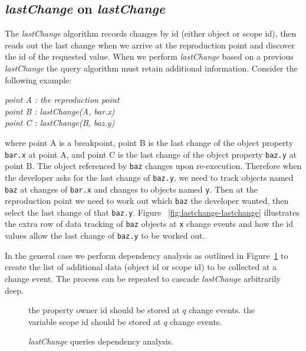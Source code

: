 \documentclass[runningheads,a4paper]{llncs}
\begin{document}
\subsection{\textit{lastChange} on \textit{lastChange}}
The \textit{lastChange} algorithm records changes by id (either object or scope id), then reads out the last change when we
arrive at the reproduction point and discover the id of the requested value.
When we perform \textit{lastChange} based on a previous \textit{lastChange} the query algorithm 
must retain additional information. Consider the following example:
\begin{center}
\textit{
 point A : the reproduction point \\
 point B : lastChange(A, bar.x) \\
 point C : lastChange(B, baz.y) 
 }
 \end{center}
where point A is a breakpoint, point B is the last change of the object property \texttt{bar.x} at point A, and
point C is the last change of the object property \texttt{baz.y} at point B. 
The object referenced by \texttt{baz} changes upon re-execution. Therefore when the developer
asks for the last change of \texttt{baz.y}, we need to track objects named \texttt{baz}
at changes of \texttt{bar.x} and changes to objects named \texttt{y}. Then at the reproduction point
we need to work out which \texttt{baz} the developer wanted, then select the last change of that \texttt{baz.y}.
Figure ~\ref{fig:lastchange-lastchange} illustrates the extra row of data tracking of \texttt{baz} objects 
at \texttt{x} change events 
and how the id values allow the last change of \texttt{baz.y} to be worked out. 
 
In the general case we perform dependency analysis  as outlined in 
Figure~\ref{fig:dependency-analysis} to
create the list of additional data (object id or scope id) to be collected at a change
event. The process can be repeated to cascade \textit{lastChange} arbitrarily deep.

\begin{figure}[htp]
\centering 
\begin{algorithmic}

     \STATE the property owner id should be stored at $q$ change events. 
     \STATE the variable scope id should be stored at $q$ change events.
	 \ENDIF 
 \ENDFOR 
\ENDFOR

\end{algorithmic}
\caption{\textit{lastChange} queries dependency analysis.}
\label{fig:dependency-analysis}
\end{figure}
\end{document}
